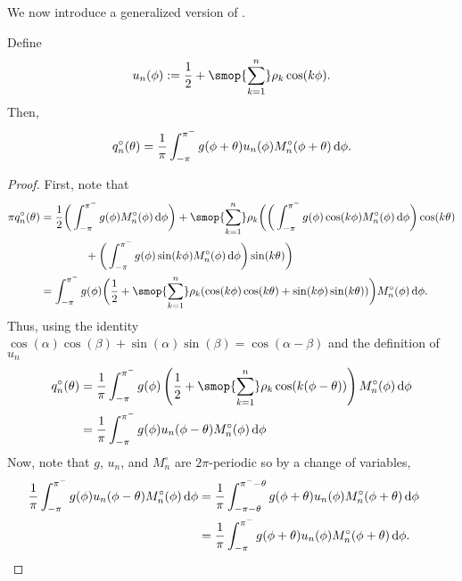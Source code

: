 We now introduce a generalized version of \cite[Lemma 1.4]{rivlin_81}.
\begin{lemma}
    Define
    \begin{equation*}
        u_n(\phi) := \frac{1}{2} + \smop{\sum_{k=1}^{n}} \rho_{k} \cos(k\phi).
    \end{equation*} 
    Then,
    \begin{equation*}
        q_n^\circ(\theta) = \frac{1}{\pi} \int_{-\pi}^{\pi^-}g(\phi+\theta) u_n(\phi) M_n^\circ(\phi+\theta) \,\textup{d}\phi.
    \end{equation*}
\end{lemma}

\begin{proof}
    First, note that
    \begin{align*}
        \pi q_n^\circ(\theta)
        &= \frac{1}{2} \bigg( \int_{-\pi}^{\pi^-} g(\phi) M_n^\circ(\phi) \,\d\phi  \bigg) 
        + \smop{\sum_{k=1}^{n}} \rho_k 
        \bigg( 
        \bigg( \int_{-\pi}^{\pi^-} g(\phi) \cos(k\phi)  M_n^\circ(\phi) \,\d\phi \bigg) \cos(k\theta)
        \\&\hspace{4em} + \bigg( \int_{-\pi}^{\pi^-} g(\phi) \sin(k\phi)  M_n^\circ(\phi) \,\d\phi \bigg) \sin(k\theta)
        \bigg)
        \\&= \int_{-\pi}^{\pi^-} g(\phi) \bigg( \frac{1}{2} + \smop{\sum_{k=1}^{n}} \rho_{k}( \cos(k\phi) \cos(k\theta) + \sin(k\phi) \sin(k\theta)) \bigg) M_n^\circ(\phi) \,\d\phi.
    \end{align*}
    Thus, using the identity \( \cos(\alpha)\cos(\beta) + \sin(\alpha)\sin(\beta) = \cos(\alpha-\beta) \) and the definition of \( u_n \)
    \begin{align*}
        q_n^\circ(\theta) 
        &= \frac{1}{\pi} \int_{-\pi}^{\pi^-} g(\phi) \left( \frac{1}{2} + \smop{\sum_{k=1}^{n}} \rho_{k} \cos(k (\phi-\theta)) \right) M_n^\circ(\phi) \,\d\phi
        \\&= \frac{1}{\pi} \int_{-\pi}^{\pi^-} g(\phi) u_n(\phi-\theta) M_n^\circ(\phi) \,\d\phi
    \end{align*} 
    Now, note that  \( g \), \( u_n \), and \( M_n^\circ \) are \( 2\pi \)-periodic so by a change of variables,
    \begin{align*}
        \frac{1}{\pi} \int_{-\pi}^{\pi^-} g(\phi) u_n(\phi-\theta) M_n^\circ(\phi) \,\textup{d}\phi
        &=\frac{1}{\pi} \int_{-\pi-\theta}^{\pi^--\theta} g(\phi+\theta) u_n(\phi) M_n^\circ(\phi+\theta) \,\textup{d}\phi
        \\&=\frac{1}{\pi} \int_{-\pi}^{\pi^-} g(\phi + \theta) u_n(\phi) M_n^\circ(\phi+\theta) \,\textup{d}\phi.
        \tag*{\qedhere}
    \end{align*}  
\end{proof}



